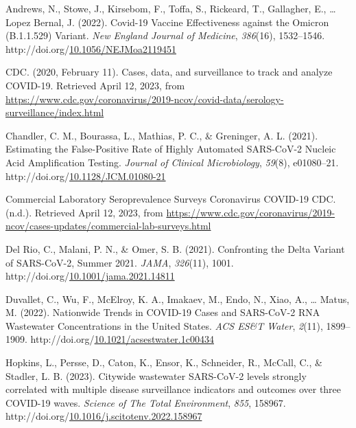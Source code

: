 \documentclass[12pt,twoside]{smiththesis}
\newlength{\cslhangindent}
\newenvironment{CSLReferences}[2] %
 {%
\setlength{\parindent}{0pt}
\ifodd #1 \everypar{\setlength{\hangindent}{\cslhangindent}}\ignorespaces\fi
\ifnum #2 > 0
\setlength{\parskip}{#2\baselineskip}
  \fi
}%
{}
\begin{document}
\hypertarget{refs}{}
\begin{CSLReferences}{1}{0}
\leavevmode{}%
Andrews, N., Stowe, J., Kirsebom, F., Toffa, S., Rickeard, T., Gallagher, E., \ldots{} Lopez Bernal, J. (2022). Covid-19 {Vaccine Effectiveness} against the {Omicron} ({B}.1.1.529) {Variant}. \emph{New England Journal of Medicine}, \emph{386}(16), 1532--1546. http://doi.org/\href{https://doi.org/10.1056/NEJMoa2119451}{10.1056/NEJMoa2119451}

\leavevmode{}%
CDC. (2020, February 11). Cases, data, and surveillance to track and analyze {COVID-19}. Retrieved April 12, 2023, from \url{https://www.cdc.gov/coronavirus/2019-ncov/covid-data/serology-surveillance/index.html}

\leavevmode{}%
Chandler, C. M., Bourassa, L., Mathias, P. C., \& Greninger, A. L. (2021). Estimating the {False-Positive Rate} of {Highly Automated SARS-CoV-2 Nucleic Acid Amplification Testing}. \emph{Journal of Clinical Microbiology}, \emph{59}(8), e01080--21. http://doi.org/\href{https://doi.org/10.1128/JCM.01080-21}{10.1128/JCM.01080-21}

\leavevmode{}%
Commercial {Laboratory Seroprevalence Surveys} \textbar{} {Coronavirus} \textbar{} {COVID-19} \textbar{} {CDC}. (n.d.). Retrieved April 12, 2023, from \url{https://www.cdc.gov/coronavirus/2019-ncov/cases-updates/commercial-lab-surveys.html}

\leavevmode{}%
Del Rio, C., Malani, P. N., \& Omer, S. B. (2021). Confronting the {Delta Variant} of {SARS-CoV-2}, {Summer} 2021. \emph{JAMA}, \emph{326}(11), 1001. http://doi.org/\href{https://doi.org/10.1001/jama.2021.14811}{10.1001/jama.2021.14811}

\leavevmode{}%
Duvallet, C., Wu, F., McElroy, K. A., Imakaev, M., Endo, N., Xiao, A., \ldots{} Matus, M. (2022). Nationwide {Trends} in {COVID-19 Cases} and {SARS-CoV-2 RNA Wastewater Concentrations} in the {United States}. \emph{ACS ES\&T Water}, \emph{2}(11), 1899--1909. http://doi.org/\href{https://doi.org/10.1021/acsestwater.1c00434}{10.1021/acsestwater.1c00434}

\leavevmode{}%
Hopkins, L., Persse, D., Caton, K., Ensor, K., Schneider, R., McCall, C., \& Stadler, L. B. (2023). Citywide wastewater {SARS-CoV-2} levels strongly correlated with multiple disease surveillance indicators and outcomes over three {COVID-19} waves. \emph{Science of The Total Environment}, \emph{855}, 158967. http://doi.org/\href{https://doi.org/10.1016/j.scitotenv.2022.158967}{10.1016/j.scitotenv.2022.158967}


\end{CSLReferences}
\end{document}
